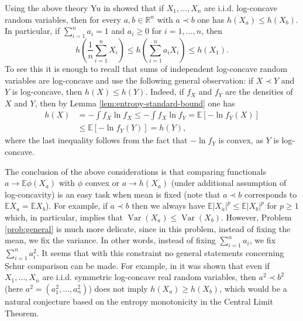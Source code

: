 \documentclass[11pt]{amsart}
\newcommand{\1}{\mathbf{1}}
\newcommand{\R}{\mathbb{R}}
\newcommand{\E}{\mathbb{E}}
\DeclareMathOperator{\var}{Var}
\theoremstyle{definition}
\theoremstyle{definition}
\theoremstyle{remark}
\begin{document}
Using the above theory Yu in \cite{Y08} showed that if $X_1,\ldots, X_n$ are i.i.d. log-concave random variables, then for every $a,b \in \R^n$ with $a \prec b$ one has $h(X_a) \leq h(X_b)$. 
In particular, if $\sum_{i=1}^n a_i=1$ and $a_i \geq 0$ for $i=1,\ldots, n$, then 
\[
h\left( \frac1n \sum_{i=1}^n   X_i \right) \leq   h\left(\sum_{i=1}^n a_i X_i\right) \leq h\left(X_1\right).
\] 
To see this it is enough to recall that sums of independent log-concave random variables are log-concave and use the following general observation: if $X \prec Y$ and $Y$ is log-concave, then  $h(X) \leq h(Y)$. Indeed, if $f_X$ and $f_Y$ are the densities of $X$ and $Y$, then by Lemma \ref{lem:entropy-standard-bound} one has
\begin{align*}
	h(X) & = - \int f_X \ln f_X \leq - \int f_X \ln f_Y  = \E [-\ln f_Y(X) ] \\ &  \leq \E [-\ln f_Y(Y) ] = h(Y),   
\end{align*}
where the last inequality follows from the fact that $-\ln f_Y$ is convex, as $Y$ is log-concave.

The conclusion of the above considerations is that comparing functionals $a \to \E \phi(X_a)$ with $\phi$ convex or $a \to h(X_a)$ (under additional assumption of log-concavity) is an easy task when mean is fixed  (note that $a \prec b$ corresponds to $\E X_a = \E X_b$). For example, if $a \prec b$ then we always have $\E |X_a|^p \leq \E |X_b|^p$ for $p \geq 1$ which, in particular, implies that $\var(X_a) \leq \var(X_b)$. However, Problem \ref{prob:general} is much more delicate, since in this problem, instead of fixing the mean, we fix the variance. In other words, instead of fixing $\sum_{i=1}^n a_i$, we fix $\sum_{i=1}^n a_i^2$. It seems that with this constraint no general statements concerning Schur comparison can be made. For example, in \cite{MNT20} it was shown that even if $X_1,\ldots, X_n$ are i.i.d. symmetric log-concave real random variables, then $a^2 \prec b^2$ (here $a^2=(a_1^2,\ldots, a_n^2)$) does not imply $h(X_a) \geq h(X_b)$, which would be a natural conjecture based on the entropy monotonicity in the Central Limit Theorem. 
\end{document}
